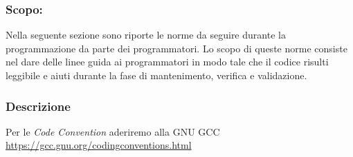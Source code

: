 \documentclass[../NomeDocumento.tex]{subfiles}
\begin{document}
	\subsubsection{Scopo:}
	
	Nella seguente sezione sono riporte le norme da seguire durante la programmazione da parte dei programmatori. Lo scopo di queste norme consiste nel dare delle linee guida ai programmatori in modo tale che il codice risulti leggibile e aiuti durante la fase di mantenimento, verifica e validazione.

	\subsubsection{Descrizione}
	
	Per le \emph{Code Convention} aderiremo alla GNU GCC \url{https://gcc.gnu.org/codingconventions.html}
\end{document}
